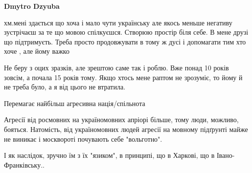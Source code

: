 \begin{itemize}
\begin{itemize}
\textbf{Dmytro Dzyuba} 

хм.мені здається що хоча і мало чути українську але якось меньше негативу
зустрічаєш за те що мовою спілкуєшся. Створюю простір біля себе. В мене друзі
що підтримуєть. Треба просто продовжувати в тому ж дусі і допомагати тим хто
хоче , але йому важко

\end{itemize}

 

Не беру з оцих зразків, але зрештою саме так і роблю. Вже понад 10 років
зовсім, а почала 15 років тому. Якщо хтось мене раптом не зрозуміє, то йому й
не треба було, а я від цього не втратила.


 
Перемагає найбільш агресивна нація/спільнота \Smiley[1.0][yellow]

 

Агресії від росмовних на україномовних апріорі більше, тому люди, можливо,
бояться. Натомість, від україномовних людей агресії на мовному підґрунті майже
не виникає і москвороті почувають себе "вольготно".

\begin{itemize}
 
І як наслідок, зручно їм з їх "язиком", в принципі, що в Харкові, що в Івано-Франківську..

 

\end{itemize}
\end{itemize}

